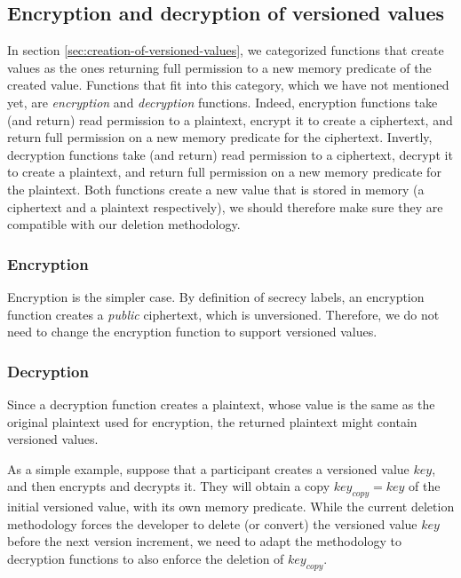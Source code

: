 \subsection{Encryption and decryption of versioned values}

In section \ref{sec:creation-of-versioned-values}, we categorized functions that create values as the ones returning full permission to a new memory predicate of the created value.
Functions that fit into this category, which we have not mentioned yet, are \emph{encryption} and \emph{decryption} functions.
Indeed, encryption functions take (and return) read permission to a plaintext, encrypt it to create a ciphertext, and return full permission on a new memory predicate for the ciphertext.
Invertly, decryption functions take (and return) read permission to a ciphertext, decrypt it to create a plaintext, and return full permission on a new memory predicate for the plaintext.
Both functions create a new value that is stored in memory (a ciphertext and a plaintext respectively), we should therefore make sure they are compatible with our deletion methodology.

\subsubsection{Encryption}

Encryption is the simpler case. By definition of secrecy labels, an encryption function creates a \emph{public} ciphertext, which is unversioned.
Therefore, we do not need to change the encryption function to support versioned values.

\subsubsection{Decryption}

Since a decryption function creates a plaintext, whose value is the same as the original plaintext used for encryption, the returned plaintext might contain versioned values.

As a simple example, suppose that a participant creates a versioned value $key$, and then encrypts and decrypts it.
They will obtain a copy $key_{copy}=key$ of the initial versioned value, with its own memory predicate.
While the current deletion methodology forces the developer to delete (or convert) the versioned value $key$ before the next version increment, we need to adapt the methodology to decryption functions to also enforce the deletion of $key_{copy}$.

